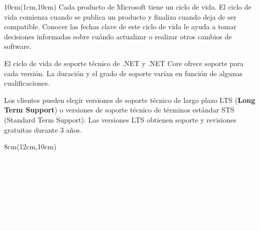 \documentclass[20pt]{article}
\begin{document}
	\fontsize{12}{13.5}\selectfont
	
	\begin{textblock*}{10cm}(1cm,10cm) %
		Cada producto de Microsoft tiene un ciclo de vida. El ciclo de vida comienza cuando se publica un producto y finaliza cuando deja de ser compatible. Conocer las fechas clave de este ciclo de vida le ayuda a tomar decisiones informadas sobre cuándo actualizar o realizar otros cambios de software. 
		
		 \noindent El ciclo de vida de soporte técnico de .NET y .NET Core ofrece soporte para cada versión. La duración y el grado de soporte varían en función de algunas cualificaciones. 
		 
		 \noindent Los clientes pueden elegir versiones de soporte técnico de largo plazo LTS (\textbf{Long Term Support}) o versiones de soporte técnico de términos estándar STS (Standard Term Support). Las versiones LTS obtienen soporte y revisiones gratuitas durante 3 años.
	\end{textblock*}
	
		\begin{textblock*}{8cm}(12cm,10cm) %
			\textcolor{white}{Las versiones STS obtienen soporte y revisiones gratuitas durante 18 meses.}\\
				
			\textcolor{white}{Cada año se publica una nueva versión principal de .NET en noviembre, lo que permite a los desarollaldores, la comunidad y las empresass planear sus planes de desarrollo.} \\
				
			\textcolor{white}{Las versiones con numeración impar son versiones STS que obtienen soporte técnico gratuito y revisiones durante 18 meses.}
				
			\textcolor{white}{Las versiones de LTS se admiten durante tres años después de la versión inicial.}
	\end{textblock*}
\end{document}
